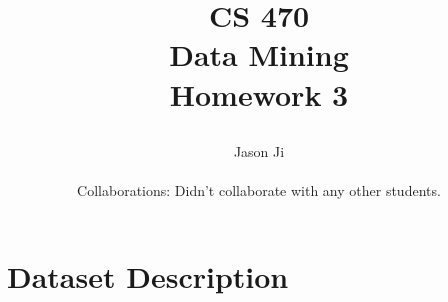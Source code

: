 \documentclass[9pt,twoside]{exam}
\begin{document}
\title{\begin{tcolorbox} \begin{center}{CS 470\\ 
\vspace{0.5cm}
Data Mining\\
\vspace{0.5cm}
Homework 3\\
 } \end{center}
 \end{tcolorbox}}
 \author{ 
 Jason Ji \\\\
Collaborations: Didn't collaborate with any other students.}
 \date{  }
 \maketitle
\pagestyle{myheadings}
\thispagestyle{plain}
\vspace{-0.5cm}







\newcommand{\bi}{\mathbf{i}}
\newcommand{\bbb}{\mathbf{b}}



\section*{Dataset Description}
\end{document}
